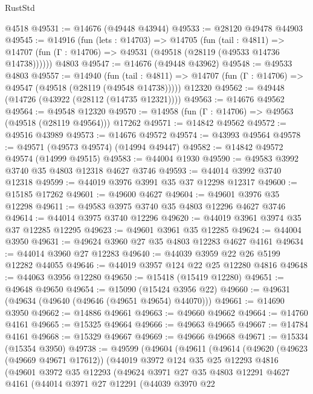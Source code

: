 \begin{lexlean}{RustStd}
\begin{coremodule}
    @4518
@49531 := @14676 (@49448 @43944)
@49533 := @28120 @49478 @44903
@49545 := @14916
    (fun (lets : @14703) =>
    @14705
      (fun (tail : @4811) =>
      @14707 (fun (Γ : @14706) => @49531 (@49518 (@28119 (@49533 @14736 @14738))))))
    @4803
@49547 := @14676 (@49448 @43962)
@49548 := @49533 @4803
@49557 := @14940
    (fun (tail : @4811) => @14707 (fun (Γ : @14706) => @49547 (@49518 (@28119 (@49548 @14738)))))
    @12320
@49562 := @49448 (@14726 (@43922 (@28112 (@14735 @12321))))
@49563 := @14676 @49562
@49564 := @49548 @12320
@49570 := @14958 (fun (Γ : @14706) => @49563 (@49518 (@28119 @49564))) @17262
@49571 := @14842 @49562
@49572 := @49516 @43989
@49573 := @14676 @49572
@49574 := @43993 @49564
@49578 := @49571 (@49573 @49574) (@14994 @49447)
@49582 := @14842 @49572 @49574 (@14999 @49515)
@49583 := @44004 @1930
@49590 := @49583 @3992 @3740 @35 @4803 @12318 @4627 @3746
@49593 := @44014 @3992 @3740 @12318
@49599 := @44019 @3976 @3991 @35 @37 @12298 @12317
@49600 := @15185 @17262
@49601 := @49600 @4627
@49604 := @49601 @3976 @35 @12298
@49611 := @49583 @3975 @3740 @35 @4803 @12296 @4627 @3746
@49614 := @44014 @3975 @3740 @12296
@49620 := @44019 @3961 @3974 @35 @37 @12285 @12295
@49623 := @49601 @3961 @35 @12285
@49624 := @44004 @3950
@49631 := @49624 @3960 @27 @35 @4803 @12283 @4627 @4161
@49634 := @44014 @3960 @27 @12283
@49640 := @44039 @3959 @22 @26 @5199 @12282 @44055
@49646 := @44019 @3957 @124 @22 @25 @12280 @4816
@49648 := @44063 @3956 @12280
@49650 := @15418 (@15419 @12280)
@49651 := @49648 @49650
@49654 := @15090 (@15424 @3956 @22)
@49660 := @49631 (@49634 (@49640 (@49646 (@49651 @49654) @44070)))
@49661 := @14690 @3950
@49662 := @14886 @49661
@49663 := @49660 @49662
@49664 := @14760 @4161
@49665 := @15325 @49664
@49666 := @49663 @49665
@49667 := @14784 @4161
@49668 := @15329 @49667
@49669 := @49666 @49668
@49671 := @15334 (@15354 @3950)
@49738 := @49599
    (@49604
      (@49611
        (@49614
          (@49620
            (@49623 (@49669 @49671 @17612))
            (@44019
              @3972
              @124
              @35
              @25
              @12293
              @4816
              (@49601
                @3972
                @35
                @12293
                (@49624
                  @3971
                  @27
                  @35
                  @4803
                  @12291
                  @4627
                  @4161
                  (@44014
                    @3971
                    @27
                    @12291
                    (@44039
                      @3970
                      @22

\end{coremodule}
\end{lexlean}
